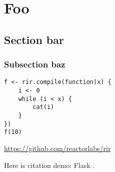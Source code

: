\chapter{Foo \label{foo}}

\blind[2]

\section{Section bar}\label{bar}

\blind[2]

\subsection{Subsection baz}\label{baz}

\blind[2]

\blind[2]

\begin{listing}[htbp]
  \begin{verbatim}
f <- rir.compile(function(x) {
    i <- 0
    while (i < x) {
        cat(i)
    }
})
f(10)
  \end{verbatim}
  \caption{\label{xxx}}
\end{listing}

\blind[2]

\url{https://github.com/reactorlabs/rir}

Here is citation demo: Flask \autocite{flask}.

\blind[2]

